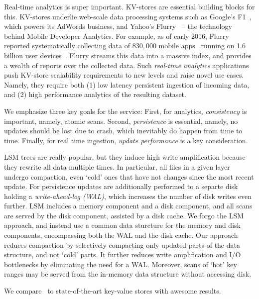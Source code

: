 

Real-time analytics is super important. KV-stores are essential building blocks for this.
KV-stores underlie web-scale data processing systems such as
Google's F1~\cite{Shute2013}, which powers its AdWords
business, and Yahoo's Flurry~\cite{flurry} --
the technology behind Mobile Developer Analytics.
For example,
as of early 2016,  Flurry  reported systematically collecting data of $830\!,000$ mobile
apps~\cite{appmatrix}
running on 1.6 billion
user devices~\cite{phablet}.
Flurry streams  this data into a massive index, and provides
a wealth of reports over the collected data.
Such
\emph{real-time analytics}  applications push KV-store scalability requirements to new levels and raise novel use cases.
Namely, they require
both
(1) low latency persistent ingestion of incoming data, and (2) high performance analytics of the resulting dataset.

We emphasize three key goals for the service: First, for analytics, \emph{consistency} is important, namely, atomic scans. 
Second, \emph{persistence} is essential, namely, no updates should be lost due to crash, which inevitably do happen from time to time\cite{?}.
Finally, for real time ingestion, \emph{update performance} is a key consideration. 

LSM trees are really popular, but they induce high write amplification because they rewrite all data multiple times. In particular,
all files in a given layer undergo compaction, even `cold' ones that have not changes since the most recent update.
For persistence updates are additionally performed to a separte disk holding a \emph{write-ahead-log (WAL)}, which increases
the number of disk writes even further. LSM includes a memory component and a disk component, and all scans are served
by the disk component, assisted by a disk cache. 
We forgo the  LSM approach, and instead use a common data sturcture for the memory and disk components, 
encompassing both the WAL and the disk cache. 
Our approach reduces compaction by selectively compacting only
updated parts of the data structure, and not `cold' parts.
It further reduces write amplification and I/O bottlenecks by eliminating the need for a WAL.
Moreover, scans of `hot' key ranges may be served from the in-memory data structure without accessing disk.

We compare \sys\ to state-of-the-art key-value stores with awesome results. 
